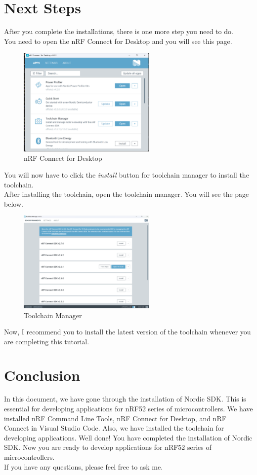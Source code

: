 \documentclass[11pt]{article}
\begin{document}
\section{Next Steps}
After you complete the installations, there is one more step you need to do. \\
You need to open the nRF Connect for Desktop and you will see this page. 

\begin{figure}[H]
    \centering
    \includegraphics[width=0.6\textwidth]{nrf.png}
    \caption{nRF Connect for Desktop}
    \label{fig: nRF Connect for Desktop}
    \end{figure}
You will now have to click the \textit{install} button for toolchain manager to install the toolchain. \\
After installing the toolchain, open the toolchain manager. You will see the page below.

\begin{figure}[H]
    \centering
    \includegraphics[width=0.6\textwidth]{toolchain.png}
    \caption{Toolchain Manager}
    \label{fig: Toolchain Manager}
    \end{figure}
Now, I recommend you to install the latest version of the toolchain whenever you are completing this tutorial. \\

\section{Conclusion}
In this document, we have gone through the installation of Nordic SDK. This is essential for developing applications for nRF52 series of microcontrollers. We have installed nRF Command Line Tools, nRF Connect for Desktop, and nRF Connect in Visual Studio Code. Also, we have installed the toolchain for developing applications. 
Well done! You have completed the installation of Nordic SDK. Now you are ready to develop applications for nRF52 series of microcontrollers. \\
If you have any questions, please feel free to ask me. \\
\end{document}
